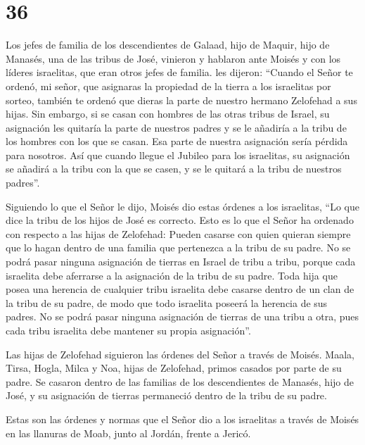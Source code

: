 \hypertarget{section-35}{%
\section{36}\label{section-35}}

 Los jefes de familia de los descendientes de Galaad, hijo
de Maquir, hijo de Manasés, una de las tribus de José, vinieron y
hablaron ante Moisés y con los líderes israelitas, que eran otros jefes
de familia.  les dijeron: ``Cuando el Señor te ordenó, mi
señor, que asignaras la propiedad de la tierra a los israelitas por
sorteo, también te ordenó que dieras la parte de nuestro hermano
Zelofehad a sus hijas.  Sin embargo, si se casan con hombres
de las otras tribus de Israel, su asignación les quitaría la parte de
nuestros padres y se le añadiría a la tribu de los hombres con los que
se casan. Esa parte de nuestra asignación sería pérdida para nosotros.
 Así que cuando llegue el Jubileo para los israelitas, su
asignación se añadirá a la tribu con la que se casen, y se le quitará a
la tribu de nuestros padres''.

 Siguiendo lo que el Señor le dijo, Moisés dio estas órdenes
a los israelitas, ``Lo que dice la tribu de los hijos de José es
correcto.  Esto es lo que el Señor ha ordenado con respecto
a las hijas de Zelofehad: Pueden casarse con quien quieran siempre que
lo hagan dentro de una familia que pertenezca a la tribu de su padre.
 No se podrá pasar ninguna asignación de tierras en Israel
de tribu a tribu, porque cada israelita debe aferrarse a la asignación
de la tribu de su padre.  Toda hija que posea una herencia
de cualquier tribu israelita debe casarse dentro de un clan de la tribu
de su padre, de modo que todo israelita poseerá la herencia de sus
padres.  No se podrá pasar ninguna asignación de tierras de
una tribu a otra, pues cada tribu israelita debe mantener su propia
asignación''.

 Las hijas de Zelofehad siguieron las órdenes del Señor a
través de Moisés.  Maala, Tirsa, Hogla, Milca y Noa, hijas
de Zelofehad, primos casados por parte de su padre.  Se
casaron dentro de las familias de los descendientes de Manasés, hijo de
José, y su asignación de tierras permaneció dentro de la tribu de su
padre.

 Estas son las órdenes y normas que el Señor dio a los
israelitas a través de Moisés en las llanuras de Moab, junto al Jordán,
frente a Jericó.
